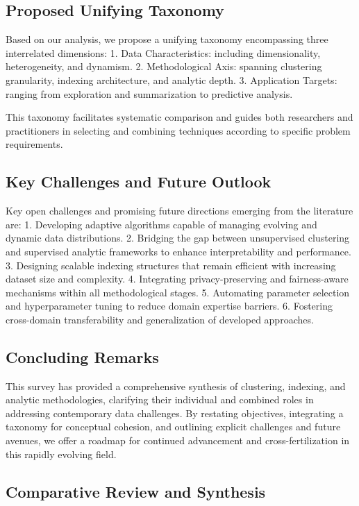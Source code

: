 \documentclass[sigconf]{acmart}
\begin{document}
\subsection{Proposed Unifying Taxonomy}
Based on our analysis, we propose a unifying taxonomy encompassing three interrelated dimensions:
1. Data Characteristics: including dimensionality, heterogeneity, and dynamism.
2. Methodological Axis: spanning clustering granularity, indexing architecture, and analytic depth.
3. Application Targets: ranging from exploration and summarization to predictive analysis.

This taxonomy facilitates systematic comparison and guides both researchers and practitioners in selecting and combining techniques according to specific problem requirements.

\subsection{Key Challenges and Future Outlook}
Key open challenges and promising future directions emerging from the literature are:
1. Developing adaptive algorithms capable of managing evolving and dynamic data distributions.
2. Bridging the gap between unsupervised clustering and supervised analytic frameworks to enhance interpretability and performance.
3. Designing scalable indexing structures that remain efficient with increasing dataset size and complexity.
4. Integrating privacy-preserving and fairness-aware mechanisms within all methodological stages.
5. Automating parameter selection and hyperparameter tuning to reduce domain expertise barriers.
6. Fostering cross-domain transferability and generalization of developed approaches.

\subsection{Concluding Remarks}
This survey has provided a comprehensive synthesis of clustering, indexing, and analytic methodologies, clarifying their individual and combined roles in addressing contemporary data challenges. By restating objectives, integrating a taxonomy for conceptual cohesion, and outlining explicit challenges and future avenues, we offer a roadmap for continued advancement and cross-fertilization in this rapidly evolving field.

\subsection{Comparative Review and Synthesis}
\end{document}

